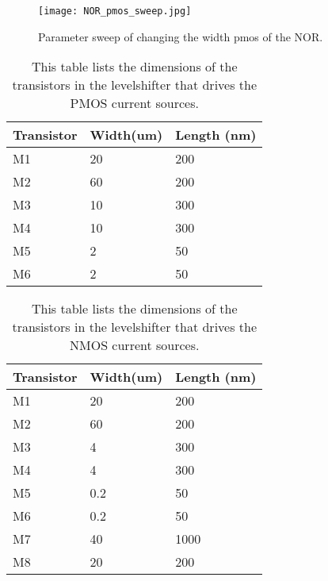 \begin{figure}[h]
 \texttt{[image: NOR\_pmos\_sweep.jpg]}
 \caption{Parameter sweep of changing the width pmos of the NOR.}
 \label{fig:NOR_pmos_sweep_figure}
\end{figure}

\begin{table}[h!]
\caption{This table lists the dimensions of the transistors in the levelshifter that drives the PMOS current sources.}
\begin{tabular}{l||l|l}\arraybackslash
Transistor & Width(um) & Length (nm) \\\hline\hline
M1 & 20 & 200\\\hline
M2 & 60 & 200\\\hline
M3 & 10 & 300\\\hline
M4 & 10 & 300\\\hline
M5 & 2 & 50\\\hline
M6 & 2 & 50
\end{tabular}
\label{Tab:Levelshifter_PMOS_sizes}
\end{table}

\begin{table}[h!]
\caption{This table lists the dimensions of the transistors in the levelshifter that drives the NMOS current sources.}
\begin{tabular}{l||l|l}\arraybackslash
Transistor & Width(um) & Length (nm) \\\hline\hline
M1 & 20 & 200\\\hline
M2 & 60 & 200\\\hline
M3 & 4 & 300\\\hline
M4 & 4 & 300\\\hline
M5 & 0.2 & 50\\\hline
M6 & 0.2 & 50\\\hline
M7 & 40 & 1000\\\hline
M8 & 20 & 200
\end{tabular}
\label{Tab:Levelshifter_NMOS_sizes}
\end{table}

